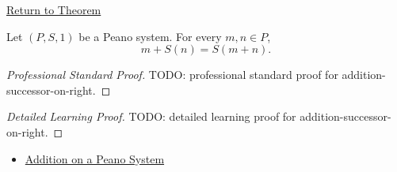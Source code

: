 \newpage
{}
\label{prf:addition-successor-on-right}

\begin{remark*}[Return]
\hyperref[thm:addition-successor-on-right]{Return to Theorem}
\end{remark*}

\begin{theorem*}
Let $(P,S,1)$ be a Peano system. For every $m,n \in P$,
\[
m+S(n)=S(m+n).
\]
\end{theorem*}

\begin{proof}[Professional Standard Proof]
\LRAProofBodyStart
TODO: professional standard proof for addition-successor-on-right.
\end{proof}

\begin{proof}[Detailed Learning Proof]
\LRAProofBodyStart
TODO: detailed learning proof for addition-successor-on-right.
\end{proof}

\begin{remark*}
\end{remark*}

\begin{dependencies}
\begin{itemize}
  \item \hyperref[def:addition-on-peano-system]{Addition on a Peano System}
\end{itemize}
\end{dependencies}

\clearpage
